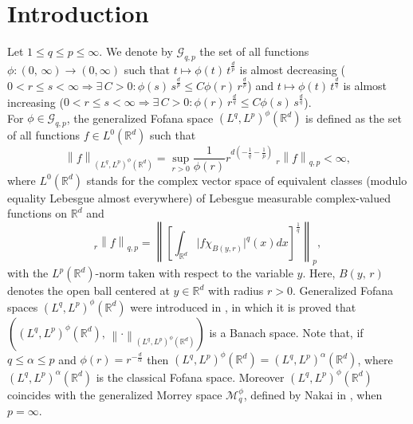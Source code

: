 \documentclass[a4paper,12pt,intlimits,oneside]{amsart}
\numberwithin{equation}{section}
\numberwithin{equation}{section}
\theoremstyle{definition}
\begin{document}
\section{Introduction}
Let $1\leq q \leq p\leq \infty$. We denote by  $\mathcal{G}_{q,p}$ the set of all functions  $\phi :(0,\,\infty) \rightarrow(0,\infty)$ such that  $t\mapsto \phi(t) \,t^{\frac{d}{p}}$ is almost decreasing ($0 <r\leq s<\infty \Rightarrow \exists\, C>0:\phi(s) \,s^{\frac{d}{p}}\leq C \phi(r) \,r^{\frac{d}{p}}$) and $t\mapsto \phi(t)\,t^{\frac{d}{q}}$ is almost increasing ($0<r\leq s<\infty \Rightarrow \exists\, C>0:\phi(r) \,r^{\frac{d}{q}}\leq C \phi(s) \,s^{\frac{d}{q}}$).\\
For $\phi \in \mathcal{G}_{q,p}$, the generalized Fofana space $ (L^{q}, L^{p})^{\phi} (\mathbb{R}^{d})$ is defined as the set of all  functions $f\in L^{0}(\mathbb{R}^{d})$  such that  
  \begin{equation*}
  \left\|f\right\|_{(L^{q},L^{p})^{\phi}(\mathbb{R}^{d})}=\sup_{r>0} \frac{1}{\phi(r)} r^{d(-\frac{1}{q}-\frac{1}{p})}
  \: _{r}\left\|f\right\|_{q,p}<\infty,
  \end{equation*}
where $ L^{0}(\mathbb{R}^{d}) $ stands for the complex vector space of equivalent classes (modulo equality Lebesgue almost everywhere) of Lebesgue measurable complex-valued functions on $ \mathbb{R}^{d}$ and
\begin{equation*}
 _{r}\left\|f\right\|_{q,p} = \left\|\left[\int_{\mathbb R^{d}}\vert f\chi_{B(y,r)}\vert^{q}(x)dx\right]^{\frac{1}{q}}\right\|_p , \label{M}
 \end{equation*} 
with the $ L^{p}(\mathbb{R}^{d})$-norm taken with respect to the variable $ y$. Here,  
 $B(y,\, r)$ denotes the open ball centered at $y \in \mathbb{R}^{d}$ with radius $r>0$. Generalized Fofana spaces $\left(L^{q},L^{p}\right)^{\phi}(\mathbb{R}^d)$ were introduced in \cite{NKD}, in which it is proved that $\left(\left(L^{q},L^{p}\right)^{\phi}(\mathbb{R}^d),\, \left\|\cdot\right\|_{(L^{q},L^{p})^{\phi}(\mathbb{R}^{d})}  \right)$ is a Banach space. Note that, if $q \leq \alpha \leq p$  and $\phi(r)=r^{-\frac{d}{\alpha}}$  then $(L^{q}, L^{p})^{\phi} (\mathbb{R}^{d})=(L^{q}, L^{p})^{\alpha}(\mathbb{R}^{d})$, where  $(L^{q}, L^{p})^{\alpha}(\mathbb{R}^{d})$ is the classical Fofana space. Moreover $(L^{q}, L^{p})^{\phi} (\mathbb{R}^{d})$ coincides with the generalized Morrey space $\mathcal{M}_{q}^{\phi}$, defined by Nakai in \cite{EN}, when $p=\infty$.
 
\end{document}
